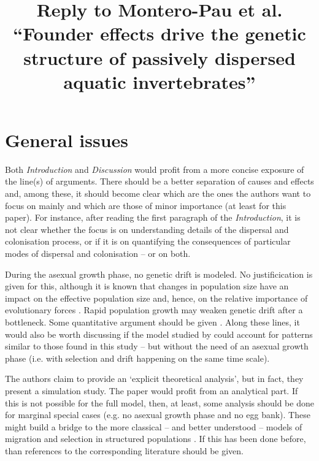 \documentclass[11pt]{article}
\title{Reply to Montero-Pau et al. ``Founder effects drive the genetic structure of passively dispersed aquatic invertebrates''}
\newenvironment{my_enumerate}
{\begin{enumerate}
  \setlength{\itemsep}{2pt}
  \setlength{\parskip}{0pt}
  \setlength{\parsep}{0pt}}
{\end{enumerate}}
\begin{document}
\maketitle


\section{General issues}


\begin{my_enumerate}
	\item Both \emph{Introduction} and \emph{Discussion} would profit from a more concise exposure of the line(s) of arguments. There should be a better separation of causes and effects and, among these, it should become clear which are the ones the authors want to focus on mainly and which are those of minor importance (at least for this paper). For instance, after reading the first paragraph of the \emph{Introduction}, it is not clear whether the focus is on understanding details of the dispersal and colonisation process, or if it is on quantifying the consequences of particular modes of dispersal and colonisation -- or on both.
	\item During the asexual growth phase, no genetic drift is modeled. No justificication is given for this, although it is known that changes in population size have an impact on the effective population size and, hence, on the relative importance of evolutionary forces \citep{Wright:1938uq}. Rapid population growth may weaken genetic drift after a bottleneck. Some quantitative argument should be given \cite[e.g.][]{Slatkin:1996fk}. Along these lines, it would also be worth discussing if the model studied by \citet{Slatkin:1996fk} could account for patterns similar to those found in this study -- but without the need of an asexual growth phase (i.e. with selection and drift happening on the same time scale).
	\item The authors claim to provide an `explicit theoretical analysis', but in fact, they present a simulation study. The paper would profit from an analytical part. If this is not possible for the full model, then, at least, some analysis should be done for marginal special cases (e.g. no asexual growth phase and no egg bank). These might build a bridge to the more classical -- and better understood -- models of migration and selection in structured populations \cite[e.g.][]{Slatkin:1996fk, Nagylaki:2008uq}. If this has been done before, than references to the corresponding literature should be given.

\end{my_enumerate}
\end{document}

